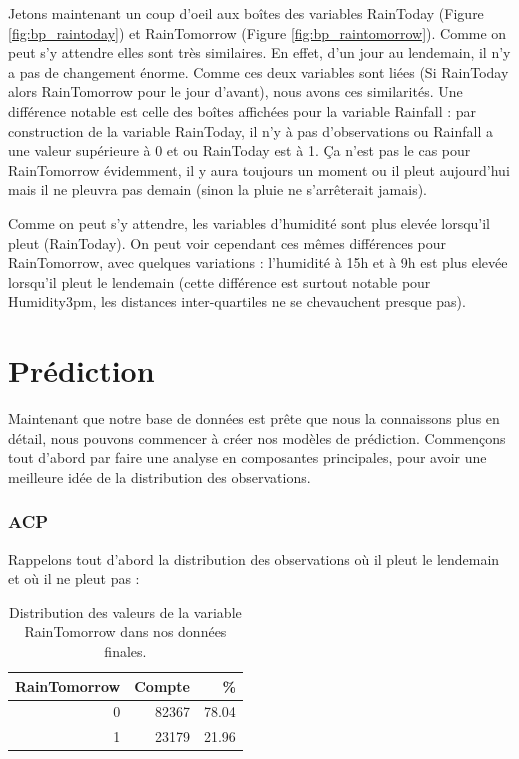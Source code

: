 \documentclass{article}
\begin{document}
Jetons maintenant un coup d'oeil aux boîtes des variables RainToday (Figure \ref{fig:bp_raintoday}) et RainTomorrow (Figure \ref{fig:bp_raintomorrow}). Comme on peut s'y attendre elles sont très similaires. En effet, d'un jour au lendemain, il n'y a pas de changement énorme. Comme ces deux variables sont liées (Si RainToday alors RainTomorrow pour le jour d'avant), nous avons ces similarités. Une différence notable est celle des boîtes affichées pour la variable Rainfall : par construction de la variable RainToday, il n'y à pas d'observations ou Rainfall a une valeur supérieure à 0 et ou RainToday est à 1. Ça n'est pas le cas pour RainTomorrow évidemment, il y aura toujours un moment ou il pleut aujourd'hui mais il ne pleuvra pas demain (sinon la pluie ne s'arrêterait jamais).

Comme on peut s'y attendre, les variables d'humidité sont plus elevée lorsqu'il pleut (RainToday). On peut voir cependant ces mêmes différences pour RainTomorrow, avec quelques variations : l'humidité à 15h et à 9h est plus elevée lorsqu'il pleut le lendemain (cette différence est surtout notable pour Humidity3pm, les distances inter-quartiles ne se chevauchent presque pas).

\part{Prédiction}

Maintenant que notre base de données est prête que nous la connaissons plus en détail, nous pouvons commencer à créer nos modèles de prédiction. Commençons tout d'abord par faire une analyse en composantes principales, pour avoir une meilleure idée de la distribution des observations.

\section{ACP}

Rappelons tout d'abord la distribution des observations où il pleut le lendemain et où il ne pleut pas : 

\begin{table}[H]
    \centering
        \begin{tabular}{|rrr|}
            \hline
            RainTomorrow & Compte & \% \\ 
            \hline
            \hline
            0 & 82367 & 78.04 \\
            1 & 23179 & 21.96 \\
            \hline
        \end{tabular}
    \caption{Distribution des valeurs de la variable RainTomorrow dans nos données finales.}
\end{table}
\end{document}
